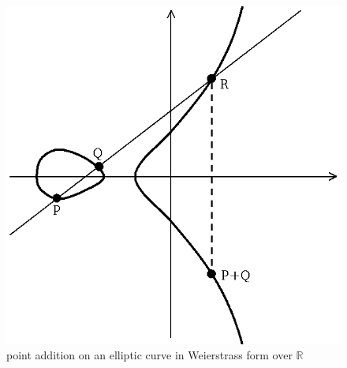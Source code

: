 \documentclass[10pt]{beamer}
\newcommand{\R}{\mathbb{R}}  %
\newcommand{\0}{\mathcal{O}}  %
\begin{document}
\begin{frame}
\begin{columns}
    \begin{column}{0.4\textwidth}
      \begin{figure}
        \centering
        \includegraphics[width=\textwidth]{ecadd}
        \caption{point addition on an elliptic curve in Weierstrass
          form over $\R$}
      \end{figure}
    \end{column}
  \end{columns}
\end{frame}

\end{document}
